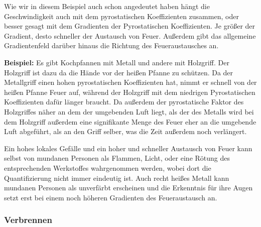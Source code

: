 \documentclass[a5paper,8pt]{book}
\begin{document}
Wie wir in diesem Beispiel auch schon angedeutet haben hängt die Geschwindigkeit auch mit dem pyrostatischen Koeffizienten 
zusammen, oder besser gesagt mit dem Gradienten der Pyrostatischen Koeffizienten. Je größer der Gradient, desto schneller 
der Austausch von Feuer. Außerdem gibt das allgemeine Gradientenfeld darüber hinaus die Richtung des Feueraustausches an.

\textbf{Beispiel:}
Es gibt Kochpfannen mit Metall und andere mit Holzgriff. Der Holzgriff ist dazu da die Hände vor der heißen Pfanne zu 
schützen. Da der Metallgriff einen hohen pyrostatischen Koeffizienten hat, nimmt er schnell von der heißen Pfanne Feuer 
auf, während der Holzgriff mit dem niedrigen Pyrostatischen Koeffizienten dafür länger braucht.
Da außerdem der pyrostatische Faktor des Holzgriffes näher an dem der umgebenden Luft liegt, als der des Metalls wird 
bei dem Holzgriff außerdem eine signifikante Menge des Feuer eher an die umgebende Luft abgeführt, als an den Griff 
selber, was die Zeit außerdem noch verlängert.\footnotemark[4]\\




Ein hohes lokales Gefälle und ein hoher und schneller Austausch von Feuer kann selbst von mundanen Personen als Flammen, 
Licht, oder eine Rötung des entsprechenden Werkstoffes wahrgenommen werden, wobei dort die Quantifizierung nicht immer 
eindeutig ist. Auch recht heißes Metall kann mundanen Personen als unverfärbt erscheinen und die Erkenntnis für ihre Augen 
setzt erst bei einem noch höheren Gradienten des Feueraustausch an.


\subsubsection{Verbrennen}
\end{document}
